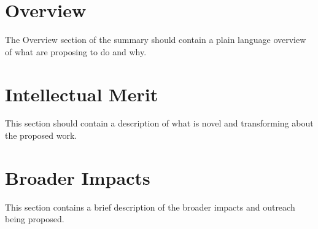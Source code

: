 \documentclass[nsfsummary]{nsfproposal}
\begin{document}
\section*{Overview}
\label{sec:overview}
The Overview section of the summary  should contain a plain language overview of what are proposing to do and why.

\section*{Intellectual Merit}
\label{sec:merit}
This section should contain a description of what is novel and transforming about the proposed work. 

\section*{Broader Impacts}
\label{sec:impacts}
This section contains a brief description of the broader impacts and outreach being proposed. 
\end{document}
